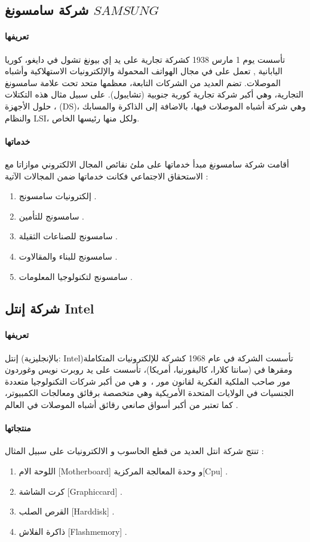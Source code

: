 \subsection{ شركة سامسونغ $ SAMSUNG $  }

\paragraph{تعريفها}
تأسست يوم 1 مارس 1938 كشركة تجارية على يد إي بيونغ تشول في دايغو، كوريا اليابانية , تعمل على  في مجال الهواتف المحمولة والإلكترونيات الاستهلاكية وأشباه الموصلات. تضم العديد من الشركات التابعة، معظمها متحد تحت علامة سامسونغ التجارية، وهي أكبر شركة تجارية كورية جنوبية (تشايبول). على سبيل مثال هذه التكتلات ، حلول الأجهزة (DS)، وهي شركة أشباه الموصلات فيها، بالاضافة إلى الذاكرة والمسابك والنظام LSI، ولكل منها رئيسها الخاص. \cite{a8}

\paragraph{خدماتها} أقامت شركة سامسونغ مبدأ خدماتها على ملئ نقائص المجال الالكتروني موازاتا مع الاستحقاق الاجتماعي فكانت خدماتها ضمن المجالات اﻵتية :
\begin{enumerate}
	\item
	إلكترونيات سامسونج .
	\item
	سامسونج للتأمين .
	\item
	سامسونج للصناعات الثقيلة .
	\item
	سامسونج للبناء والمقالاوت .
	\item
	سامسونج لتكنولوجيا المعلومات . \cite{a8}
\end{enumerate}

\subsection{ شركة إنتل  Intel }

\paragraph{تعريفها}
إنتل (بالإنجليزية: Intel)‏ تأسست الشركة في عام 1968 كشركة للإلكترونيات المتكاملة ومقرها في (سانتا كلارا، كاليفورنيا، أمريكا)، تأسست على يد روبرت نويس وغوردون مور صاحب الملكية الفكرية لقانون مور ، و هي من أكبر شركات التكنولوجيا متعددة الجنسيات في الولايات المتحدة الأمريكية وهي متخصصة برقائق ومعالجات الكمبيوتر، كما تعتبر من أكبر أسواق صانعي رقائق أشباه الموصلات في العالم . \cite{a9}

\paragraph{منتجاتها}
تنتج شركة انتل العديد من قطع الحاسوب و الالكترونيات على سبيل المثال :
\begin{enumerate}
	\item
	اللوحة الام [Motherboard] و وحدة المعالجة المركزية[Cpu] .
	\item
	كرت الشاشة [Graphiccard] .
	\item
	القرص الصلب [Harddisk] .
	\item
	 ذاكرة الفلاش [Flashmemory] .
	
\end{enumerate}

